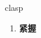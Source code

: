 
\begin{frame}
{\huge clasp}
\begin{center}
\begin{enumerate}\Large
  \item \textbf{紧握}
\end{enumerate}
\end{center}
\end{frame}
